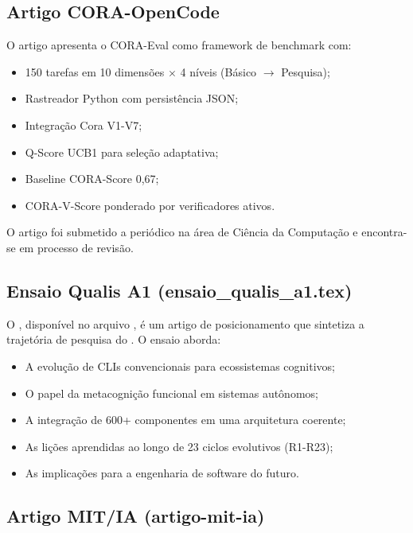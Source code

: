 \subsection{Artigo CORA-OpenCode}

O artigo  \cite{laranjeira2026cora}
apresenta o CORA-Eval como framework de benchmark com:

\begin{itemize}
\item 150 tarefas em 10 dimensões $\times$ 4 níveis (Básico $\rightarrow$ Pesquisa);
\item Rastreador Python com persistência JSON;
\item Integração Cora V1-V7;
\item Q-Score UCB1 para seleção adaptativa;
\item Baseline CORA-Score 0,67;
\item CORA-V-Score ponderado por verificadores ativos.
\end{itemize}

O artigo foi submetido a periódico \qualisA{} na área de Ciência da Computação
e encontra-se em processo de revisão.

\subsection{Ensaio Qualis A1 (ensaio\_qualis\_a1.tex)}

O , disponível no arquivo
, é um artigo de posicionamento que sintetiza
a trajetória de pesquisa do \opencodeeco{}. O ensaio aborda:

\begin{itemize}
\item A evolução de CLIs convencionais para ecossistemas cognitivos;
\item O papel da metacognição funcional em sistemas autônomos;
\item A integração de 600+ componentes em uma arquitetura coerente;
\item As lições aprendidas ao longo de 23 ciclos evolutivos (R1-R23);
\item As implicações para a engenharia de software do futuro.
\end{itemize}

\subsection{Artigo MIT/IA (artigo-mit-ia)}


